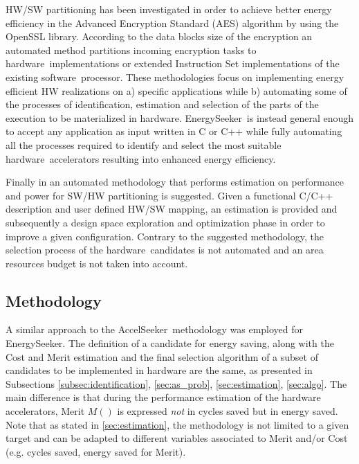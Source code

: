 \documentclass[]{usiinfthesis}
\newcommand{\aseeker}{{AccelSeeker}}
\newcommand{\eseeker}{{EnergySeeker}}
\newcommand{\HW}{{hardware}}
\newcommand{\SW}{{software}}
\begin{document}
HW/SW partitioning has been investigated \cite{XiaoMay18} in order to achieve better 
energy efficiency in the Advanced Encryption Standard (AES) algorithm by using the OpenSSL 
\cite{OpensslDec98} library. According to the data blocks size of the encryption an automated 
method partitions incoming encryption tasks to \HW\ implementations or extended Instruction Set 
implementations of the existing \SW\ processor. These methodologies focus on implementing 
energy efficient HW realizations on a) specific applications while b) automating some of the 
processes of identification, estimation and selection of the parts of the execution to be 
materialized in \HW. \eseeker\ is instead general enough to accept any application as 
input written in C or C++ while fully automating all the processes required to identify and 
select the most suitable \HW\ accelerators resulting into enhanced energy efficiency.\par

Finally in \cite{GruttnerNov13} an automated methodology that performs estimation on performance 
and power for SW/HW partitioning is suggested. Given a functional C/C++ description and user 
defined HW/SW mapping, an estimation is provided and subsequently a design space exploration 
and optimization phase in order to improve a given configuration. Contrary to the suggested 
methodology, the selection process of the \HW\ candidates is not automated and an area 
 resources budget is not taken into account.
%
%
%
%
%
\subsection{Methodology}
\label{sec:meth_es}

A similar approach to the \aseeker\ methodology was employed for \eseeker. 
The definition of a candidate for energy saving, along with the Cost and Merit estimation 
and the final selection algorithm of a subset of candidates to be implemented in hardware are 
the same, as presented in Subsections \ref{subsec:identification},  
\ref{sec:as_prob}, \ref{sec:estimation}, \ref{sec:algo}. The main difference is that during
the performance estimation of the hardware accelerators, Merit $M()$ is expressed \emph{not} 
in cycles saved but in energy saved. Note that as stated in \ref{sec:estimation}, the methodology
is not limited to a given target and can be adapted to different variables associated to Merit and/or Cost
(e.g. cycles saved, energy saved for Merit).\par
\end{document}
